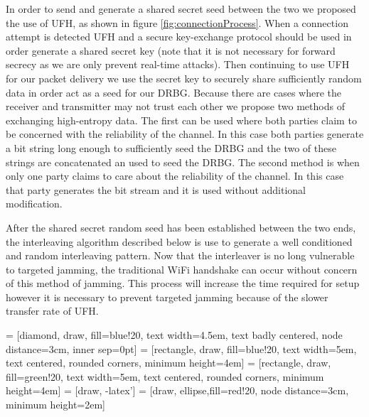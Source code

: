 \documentclass[sigconf]{acmart}
\begin{document}
In order to send and generate a shared secret seed between the two we proposed the use of UFH, as shown in figure \ref{fig:connectionProcess}. When a connection attempt is detected UFH and a secure key-exchange protocol should be used in order generate a shared secret key (note that it is not necessary for forward secrecy as we are only prevent real-time attacks). Then continuing to use UFH for our packet delivery we use the secret key to securely share sufficiently random data in order act as a seed for our DRBG. Because there are cases where the receiver and transmitter may not trust each other we propose two methods of exchanging high-entropy data. The first can be used where both parties claim to be concerned with the reliability of the channel. In this case both parties generate a bit string long enough to sufficiently seed the DRBG and the two of these strings are concatenated an used to seed the DRBG. The second method is when only one party claims to care about the reliability of the channel. In this case that party generates the bit stream and it is used without additional modification. 

After the shared secret random seed has been established between the two ends, the interleaving algorithm described below is use to generate a well conditioned and random interleaving pattern. Now that the interleaver is no long vulnerable to targeted jamming, the traditional WiFi handshake can occur without concern of this method of jamming. This process will increase the time required for setup however it is necessary to prevent targeted jamming because of the slower transfer rate of UFH\cite{strasser2008jamming}.

 = [diamond, draw, fill=blue!20, 
    text width=4.5em, text badly centered, node distance=3cm, inner sep=0pt]
 = [rectangle, draw, fill=blue!20, 
    text width=5em, text centered, rounded corners, minimum height=4em]
 = [rectangle, draw, fill=green!20, 
    text width=5em, text centered, rounded corners, minimum height=4em]
 = [draw, -latex']
 = [draw, ellipse,fill=red!20, node distance=3cm,
    minimum height=2em]
\end{document}
